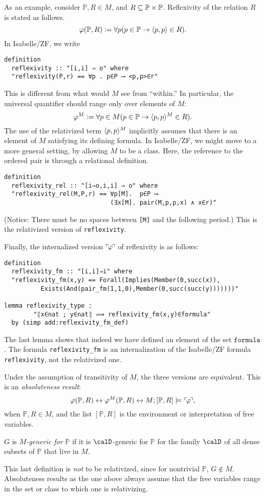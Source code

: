 \documentclass[11pt,english]{article}
\renewcommand{\PP}{\mathbb{P}}
\newcommand{\formula}{\ensuremath{\mathtt{formula}}}
\begin{document}
As an example, consider $\PP,R \in M$,  and $R\sbq
\PP\times\PP$. Reflexivity of the relation $R$ is 
stated as follows.
\[
\phi(\PP,R)\defi \forall p (p\in \PP \limp \lb p,p\rb \in R).
\]
In Isabelle/ZF, we write
%
\begin{verbatim}
definition 
  reflexivity :: "[i,i] ⇒ o" where
  "reflexivity(P,r) == ∀p . p∈P ⟶ <p,p>∈r"
\end{verbatim}

This is different from what would $M$ see from ``within.'' In
particular, the universal quantifier should range only over elements
of $M$:
\[
\phi^M\defi\forall p\in M (p\in \PP \limp \lb p,p\rb^M \in R).
\]
The use of the relativized term $\langle p,p\rangle^M$ implicitly assumes that
there is an element of $M$ satisfying its defining formula. In
Isabelle/ZF, we might move to a more general setting, by allowing  $M$
to be a class. Here, the reference to the ordered pair  is through a
relational definition.
\begin{verbatim}
definition  
  reflexivity_rel :: "[i⇒o,i,i] ⇒ o" where
  "reflexivity_rel(M,P,r) == ∀p[M].  p∈P ⟶ 
                             (∃x[M]. pair(M,p,p,x) ∧ x∈r)"
\end{verbatim}
(Notice: There must be no spaces between \verb|[M]| and the following
period.) This is the relativized version of
\verb|reflexivity|. 

Finally, the internalized version $\ulcorner{\!\varphi\!}\urcorner$ of reflexivity is as
follows: 
\begin{verbatim}
definition
  reflexivity_fm :: "[i,i]⇒i" where
  "reflexivity_fm(x,y) == Forall(Implies(Member(0,succ(x)),
          Exists(And(pair_fm(1,1,0),Member(0,succ(succ(y)))))))"

lemma reflexivity_type : 
        "⟦x∈nat ; y∈nat⟧ ⟹ reflexivity_fm(x,y)∈formula"
  by (simp add:reflexivity_fm_def)
\end{verbatim}

The last lemma shows that indeed we have defined an element of the set
\formula. The formula \verb|reflexivity_fm| is an internalization of
the Isabelle/ZF formula \verb|reflexivity|, not the relativized
one.

Under the assumption of transitivity of $M$, the three versions are
equivalent. This is an \emph{absoluteness result}:
\[
\phi(\PP,R) \lsii \phi^M(\PP,R) \lsii M;[\PP,R]\models\quine{\phi},
\]
when $\PP,R\in M$, and the list $[\PP,R]$ is the environment or
interpretation of free variables. 

\begin{definition}
  $G$ is \emph{$M$-generic for $\PP$} if it is $\calD$-generic for
  $\PP$ for the family $\calD$ of all dense subsets of $\PP$ that live
  in $M$.
\end{definition}
This last definition is \emph{not} to be relativized, since for
nontrivial $\PP$, $G\notin M$. Absoluteness results as the one above
always assume that the free variables range in the set or class to
which one is relativizing.
\end{document}

